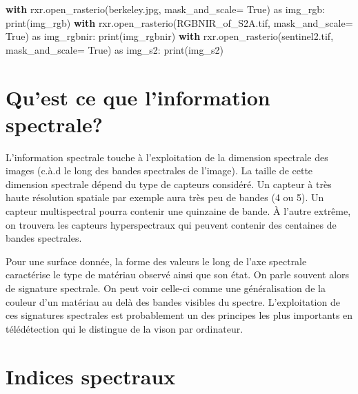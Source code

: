 \documentclass[
  11pt,
  letterpaper,
  open=any,
  twoside=false,
  french]{scrbook}
\newenvironment{Shaded}{\begin{snugshade}}{\end{snugshade}}
\newcommand{\BuiltInTok}[1]{\textcolor[rgb]{0.00,0.23,0.31}{#1}}
\newcommand{\ControlFlowTok}[1]{\textcolor[rgb]{0.00,0.23,0.31}{\textbf{#1}}}
\newcommand{\ImportTok}[1]{\textcolor[rgb]{0.00,0.46,0.62}{#1}}
\newcommand{\NormalTok}[1]{\textcolor[rgb]{0.00,0.23,0.31}{#1}}
\newcommand{\OperatorTok}[1]{\textcolor[rgb]{0.37,0.37,0.37}{#1}}
\newcommand{\StringTok}[1]{\textcolor[rgb]{0.13,0.47,0.30}{#1}}
\newcommand{\VariableTok}[1]{\textcolor[rgb]{0.07,0.07,0.07}{#1}}
\begin{document}
\begin{Shaded}
\begin{Highlighting}[]
\ControlFlowTok{with}\NormalTok{ rxr.open\_rasterio(}\StringTok{\textquotesingle{}berkeley.jpg\textquotesingle{}}\NormalTok{, mask\_and\_scale}\OperatorTok{=} \VariableTok{True}\NormalTok{) }\ImportTok{as}\NormalTok{ img\_rgb:}
    \BuiltInTok{print}\NormalTok{(img\_rgb)}
\ControlFlowTok{with}\NormalTok{ rxr.open\_rasterio(}\StringTok{\textquotesingle{}RGBNIR\_of\_S2A.tif\textquotesingle{}}\NormalTok{, mask\_and\_scale}\OperatorTok{=} \VariableTok{True}\NormalTok{) }\ImportTok{as}\NormalTok{ img\_rgbnir:}
    \BuiltInTok{print}\NormalTok{(img\_rgbnir)}
\ControlFlowTok{with}\NormalTok{ rxr.open\_rasterio(}\StringTok{\textquotesingle{}sentinel2.tif\textquotesingle{}}\NormalTok{, mask\_and\_scale}\OperatorTok{=} \VariableTok{True}\NormalTok{) }\ImportTok{as}\NormalTok{ img\_s2:}
    \BuiltInTok{print}\NormalTok{(img\_s2)}
\end{Highlighting}
\end{Shaded}

\section{Qu'est ce que l'information
spectrale?}\label{quest-ce-que-linformation-spectrale}

L'information spectrale touche à l'exploitation de la dimension
spectrale des images (c.à.d le long des bandes spectrales de l'image).
La taille de cette dimension spectrale dépend du type de capteurs
considéré. Un capteur à très haute résolution spatiale par exemple aura
très peu de bandes (4 ou 5). Un capteur multispectral pourra contenir
une quinzaine de bande. À l'autre extrême, on trouvera les capteurs
hyperspectraux qui peuvent contenir des centaines de bandes spectrales.

Pour une surface donnée, la forme des valeurs le long de l'axe spectrale
caractérise le type de matériau observé ainsi que son état. On parle
souvent alors de signature spectrale. On peut voir celle-ci comme une
généralisation de la couleur d'un matériau au delà des bandes visibles
du spectre. L'exploitation de ces signatures spectrales est probablement
un des principes les plus importants en télédétection qui le distingue
de la vison par ordinateur.

\section{Indices spectraux}\label{indices-spectraux}
\end{document}
